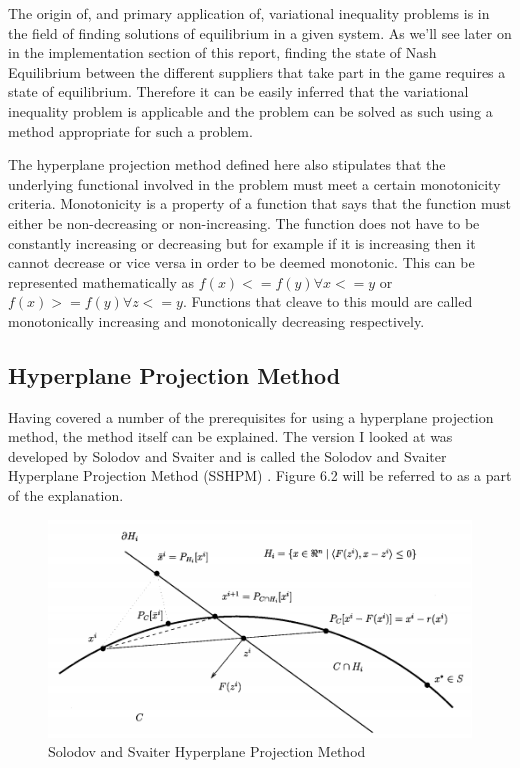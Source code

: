 \documentclass[a4paper, notitlepage]{report}
\begin{document}
The origin of, and primary application of, variational inequality problems is in
the field of finding solutions of equilibrium in a given system. As we'll see
later on in the implementation section of this report, finding the state of Nash
Equilibrium between the different suppliers that take part in the game requires a
state of equilibrium. Therefore it can be easily inferred that the variational
inequality problem is applicable and the problem can be solved as such using a
method appropriate for such a problem.

The hyperplane projection method defined here also stipulates that the
underlying functional involved in the problem must meet a certain monotonicity
criteria. Monotonicity is a property of a function that says that the function
must either be non-decreasing or non-increasing. The function does not have to
be constantly increasing or decreasing but for example if it is increasing then
it cannot decrease or vice versa in order to be deemed monotonic. This can be
represented mathematically as \(f(x) <= f(y) \forall x <= y\) or \(f(x) >= f(y) \forall z <=
y\). Functions that cleave to this mould are called monotonically increasing and
monotonically decreasing respectively. 
\subsection{Hyperplane Projection Method}
\label{sec:org3d3bb2a}
Having covered a number of the prerequisites for using a hyperplane projection
method, the method itself can be explained. The version I looked at was
developed by Solodov and Svaiter and is called the Solodov and Svaiter
Hyperplane Projection Method (SSHPM) \cite{solodov1999new}. Figure 6.2 will be
referred to as a part of the explanation.

\begin{figure}[htbp]
\centering
\includegraphics[width=.9\linewidth]{./img/SSHPM.png}
\caption{\label{fig:orgb5235e0}
Solodov and Svaiter Hyperplane Projection Method}
\end{figure}
\end{document}
